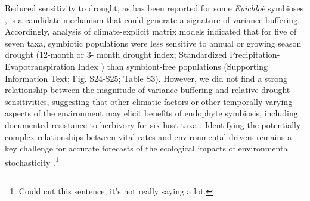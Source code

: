 \documentclass[9pt,twocolumn,twoside]{pnas-new}
\begin{document}
Reduced sensitivity to drought, as has been reported for some \emph{Epichlo\"{e}} symbioses \cite{decunta2021systematic}, is a candidate mechanism that could generate a signature of variance buffering.
Accordingly, analysis of climate-explicit matrix models indicated that for five of seven taxa, symbiotic populations were less sensitive to annual or growing season drought (12-month or 3- month drought index; Standardized Precipitation-Evapotranspiration Index \cite{vicente2010multiscalar}) than symbiont-free populations (Supporting Information Text; Fig. S24-S25; Table S3).
However, we did not find a strong relationship between the magnitude of variance buffering and relative drought sensitivities, suggesting that other climatic factors or other temporally-varying aspects of the environment may elicit benefits of endophyte symbiosis, including documented resistance to herbivory for six host taxa \cite{rudgers2008invasive,crawford2010fungal}.
Identifying the potentially complex relationships between vital rates and environmental drivers remains a key challenge for accurate forecasts of the ecological impacts of environmental stochasticity \cite{ehrlen2015predicting}.\footnote{Could cut this sentence, it's not really saying a lot.}
\end{document}
